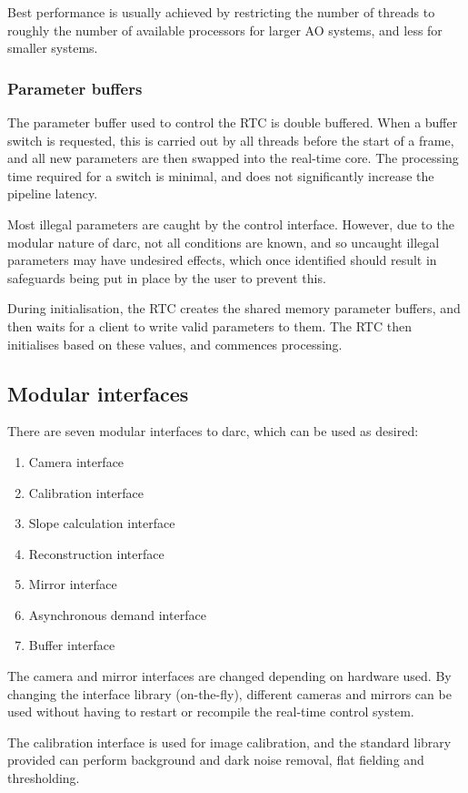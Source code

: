 \documentclass[a4,10pt]{article}
\begin{document}
Best performance is usually achieved by restricting the number of
threads to roughly the number of available processors for larger AO
systems, and less for smaller systems.

\subsubsection{Parameter buffers}
The parameter buffer used to control the RTC is double buffered.  When
a buffer switch is requested, this is carried out by all threads
before the start of a frame, and all new parameters are then swapped
into the real-time core.  The processing time required for a
switch is minimal, and does not significantly increase the
pipeline latency.

Most illegal parameters are caught by the control interface.  However,
due to the modular nature of darc, not all conditions are known, and
so uncaught illegal parameters may have undesired effects, which once
identified should result in safeguards being put in place by the user
to prevent this.

During initialisation, the RTC creates the shared memory parameter
buffers, and then waits for a client to write valid parameters to
them.  The RTC then initialises based on these values, and
commences processing.

\subsection{Modular interfaces}
There are seven modular interfaces to darc, which can be used as
desired:
\begin{enumerate}
\item Camera interface
\item Calibration interface
\item Slope calculation interface
\item Reconstruction interface
\item Mirror interface
\item Asynchronous demand interface
\item Buffer interface
\end{enumerate}


The camera and mirror interfaces are changed depending on hardware
used.  By changing the interface library (on-the-fly), different
cameras and mirrors can be used without having to restart or recompile
the real-time control system.

The calibration interface is used for image calibration, and the
standard library provided can perform background and dark noise
removal, flat fielding and thresholding.
\end{document}
